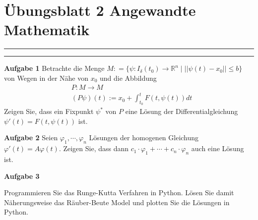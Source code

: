 \documentclass[a4paper,13pt]{scrartcl}
\begin{document}
\section*{\large  Übungsblatt 2 \hfill Angewandte Mathematik }
\hrule
\hrule
\vspace{4mm}

{\bf Aufgabe 1}
Betrachte die Menge  $M: = \{ \psi : I_\delta (t_0) \to \mathbb{R}^n \; | \; ||\psi(t) - x_0 || \leq b  \}$ von Wegen in der Nähe von $x_0$ und die Abbildung
\begin{align*}
& P : M \to M \\
& (P \psi)(t) := x_0 + \int_{t_0}^{t} F(t, \psi(t)) dt
\end{align*}
Zeigen Sie, dass ein Fixpunkt $\psi^*$ von $P$ eine Lösung der Differentialgleichung 
$\psi'(t) = F(t, \psi(t))$ ist.
\vspace{8mm}


{\bf Aufgabe 2}
Seien  $\varphi_1, \cdots, \varphi_n$ 
Lösungen der homogenen Gleichung $\varphi'(t) = A \varphi(t)$.
Zeigen Sie, dass dann
 $c_1 \cdot \varphi_1 + \cdots + c_n \cdot \varphi_n$  auch eine Lösung ist.
\vspace{8mm}

\vspace{8mm}

{\bf Aufgabe 3}

Programmieren Sie das Runge-Kutta Verfahren in Python. Lösen Sie damit Näherungsweise
das Räuber-Beute Model und plotten Sie die Lösungen in Python. 
\end{document}
